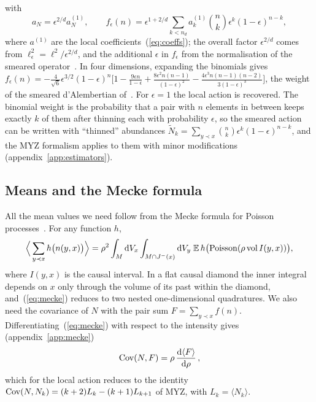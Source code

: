 \documentclass{iopjournal}
\newcommand{\eref}[1]{(\ref{#1})}
\newcommand{\rmd}{\mathrm{d}}
\begin{document}
with
\begin{equation}
a_N=\epsilon^{2/d}a_N^{(1)},\qquad
f_\epsilon(n)=\epsilon^{1+2/d}\sum_{k<n_d}a_k^{(1)}
{n\choose k}\epsilon^k(1-\epsilon)^{n-k},
\label{eq:smeared}
\end{equation}
where $a^{(1)}$ are the local coefficients~\eref{eq:coeffs}; the overall
factor $\epsilon^{2/d}$ comes from $\ell_\epsilon^2=\ell^2/\epsilon^{2/d}$, and
the additional $\epsilon$ in $f_\epsilon$ from the normalisation of the smeared
operator~\cite{Dowker2013}. In four dimensions, expanding the binomials gives
$f_\epsilon(n)=-\frac{4}{\sqrt6}\epsilon^{3/2}(1-\epsilon)^n\big[1-\frac{9\epsilon
n}{1-\epsilon}+\frac{8\epsilon^2n(n-1)}{(1-\epsilon)^2}-\frac{4\epsilon^3n(n-1)(n-2)}
{3(1-\epsilon)^3}\big]$, the weight of the smeared d'Alembertian
of~\cite{Benincasa2010}. For $\epsilon=1$ the local action is recovered. The
binomial weight is the probability that a pair with $n$ elements in between
keeps exactly $k$ of them after thinning each with probability $\epsilon$, so
the smeared action can be written with ``thinned'' abundances
$\tilde N_k=\sum_{y\prec x}{n\choose k}\epsilon^k(1-\epsilon)^{n-k}$, and the
MYZ formalism applies to them with minor modifications
(appendix~\ref{app:estimators}).

\subsection{Means and the Mecke formula}

All the mean values we need follow from the Mecke formula for Poisson
processes~\cite{LastPenrose2017}. For any function $h$,
\begin{equation}
\Big\langle\sum_{y\prec x}h\big(n(y,x)\big)\Big\rangle
=\rho^2\int_M\rmd V_x\int_{M\cap J^-(x)}\rmd V_y\;
\mathbb{E}\,h\big(\mathrm{Poisson}(\rho\,{\rm vol}\,I(y,x))\big),
\label{eq:mecke}
\end{equation}
where $I(y,x)$ is the causal interval. In a flat causal diamond the inner
integral depends on $x$ only through the volume of its past within the
diamond, and~\eref{eq:mecke} reduces to two nested one-dimensional
quadratures. We also need the covariance of $N$ with the
pair sum $F=\sum_{y\prec x}f(n)$. Differentiating~\eref{eq:mecke} with respect
to the intensity gives (appendix~\ref{app:mecke})
\begin{equation}
{\rm Cov}(N,F)=\rho\,\frac{\rmd\langle F\rangle}{\rmd\rho}\,,
\label{eq:covNF}
\end{equation}
which for the local action reduces to the identity
${\rm Cov}(N,N_k)=(k+2)L_k-(k+1)L_{k+1}$ of MYZ, with $L_k=\langle N_k\rangle$.
\end{document}
